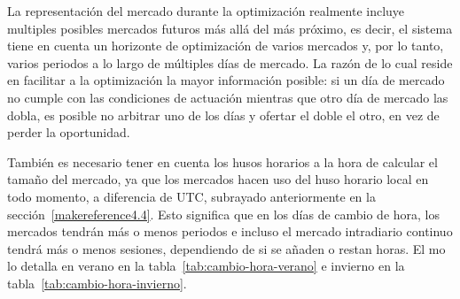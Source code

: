 La representación del mercado durante la optimización realmente incluye multiples posibles mercados futuros más allá del más próximo, es decir, el sistema tiene en cuenta un horizonte de optimización de varios mercados y, por lo tanto, varios periodos a lo largo de múltiples días de mercado. La razón de lo cual reside en facilitar a la optimización la mayor información posible: si un día de mercado no cumple con las condiciones de actuación mientras que otro día de mercado las dobla, es posible no arbitrar uno de los días y ofertar el doble el otro, en vez de perder la oportunidad.

También es necesario tener en cuenta los husos horarios a la hora de calcular el tamaño del mercado, ya que los mercados hacen uso del huso horario local en todo momento, a diferencia de UTC, subrayado anteriormente en la sección~\ref{makereference4.4}. Esto significa que en los días de cambio de hora, los mercados  tendrán más o menos periodos e incluso el mercado intradiario continuo tendrá más o menos sesiones, dependiendo de si se añaden o restan horas. El \gls{mo} lo detalla en verano en la tabla~\ref{tab:cambio-hora-verano} e invierno en la tabla~\ref{tab:cambio-hora-invierno}.

\begin{table}[ht]
  \centering
  \caption[Ajustes del mercado intradiario en cambios de hora de verano.]{Ajustes del mercado intradiario en cambios de hora de verano.}%
  \label{tab:cambio-hora-verano}
\end{table}

